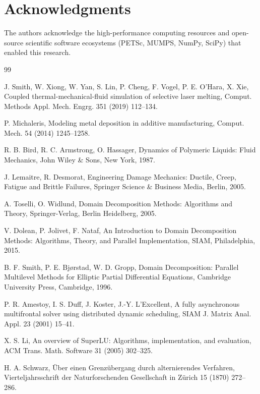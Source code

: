 \documentclass[preprint,12pt,3p]{elsarticle}
\begin{document}
\section*{Acknowledgments}
The authors acknowledge the high-performance computing resources and open-source scientific software ecosystems (PETSc, MUMPS, NumPy, SciPy) that enabled this research.

\begin{thebibliography}{99}

J. Smith, W. Xiong, W. Yan, S. Lin, P. Cheng, F. Vogel, P. E. O’Hara, X. Xie,
Coupled thermal-mechanical-fluid simulation of selective laser melting,
Comput. Methods Appl. Mech. Engrg. 351 (2019) 112--134.

P. Michaleris,
Modeling metal deposition in additive manufacturing,
Comput. Mech. 54 (2014) 1245--1258.

R. B. Bird, R. C. Armstrong, O. Hassager,
Dynamics of Polymeric Liquids: Fluid Mechanics,
John Wiley \& Sons, New York, 1987.

J. Lemaitre, R. Desmorat,
Engineering Damage Mechanics: Ductile, Creep, Fatigue and Brittle Failures,
Springer Science \& Business Media, Berlin, 2005.

A. Toselli, O. Widlund,
Domain Decomposition Methods: Algorithms and Theory,
Springer-Verlag, Berlin Heidelberg, 2005.

V. Dolean, P. Jolivet, F. Nataf,
An Introduction to Domain Decomposition Methods: Algorithms, Theory, and Parallel Implementation,
SIAM, Philadelphia, 2015.

B. F. Smith, P. E. Bj{\o}rstad, W. D. Gropp,
Domain Decomposition: Parallel Multilevel Methods for Elliptic Partial Differential Equations,
Cambridge University Press, Cambridge, 1996.

P. R. Amestoy, I. S. Duff, J. Koster, J.-Y. L'Excellent,
A fully asynchronous multifrontal solver using distributed dynamic scheduling,
SIAM J. Matrix Anal. Appl. 23 (2001) 15--41.

X. S. Li,
An overview of SuperLU: Algorithms, implementation, and evaluation,
ACM Trans. Math. Software 31 (2005) 302--325.

H. A. Schwarz,
{\"U}ber einen Grenzübergang durch alternierendes Verfahren,
Vierteljahrsschrift der Naturforschenden Gesellschaft in Z{\"u}rich 15 (1870) 272--286.


\end{thebibliography}
\end{document}
